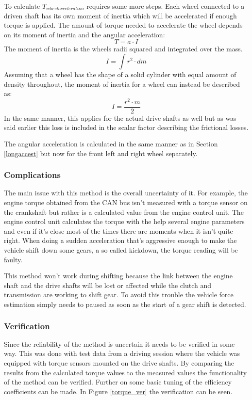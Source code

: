 To calculate $ T_{wheelacceleration} $ requires some more steps. Each wheel connected to a driven shaft has its own moment of inertia which will be accelerated if enough torque is applied. The amount of torque needed to accelerate the wheel depends on its moment of inertia and the angular acceleration:
\begin{equation}
	T = a \cdot I
\end{equation}
The moment of inertia is the wheels radii squared and integrated over the mass. 
\begin{equation}
	I = \int r^2 \cdot dm
\end{equation}
Assuming that a wheel has the shape of a solid cylinder with equal amount of density throughout, the moment of inertia for a wheel can instead be described as:
\begin{equation}
	I = \dfrac{r^2 \cdot m}{2} 
\end{equation}
In the same manner, this applies for the actual drive shafts as well but as was said earlier this loss is included in the scalar factor describing the frictional losses.

The angular acceleration is calculated in the same manner as in Section \ref{longaccest} but now for the front left and right wheel separately.


\subsubsection{Complications}
The main issue with this method is the overall uncertainty of it. For example, the engine torque obtained from the CAN bus isn't measured with a torque sensor on the crankshaft but rather is a calculated value from the engine control unit. The engine control unit calculates the torque with the help several engine parameters and even if it's close most of the times there are moments when it isn't quite right. When doing a sudden acceleration that's aggressive enough to make the vehicle shift down some gears, a so called kickdown, the torque reading will be faulty. 

This method won't work during shifting because the link between the engine shaft and the drive shafts will be lost or affected while the clutch and transmission are working to shift gear. To avoid this trouble the vehicle force estimation simply needs to paused as soon as the start of a gear shift is detected.

\subsubsection{Verification}
Since the reliability of the method is uncertain it needs to be verified in some way. This was done with test data from a driving session where the vehicle was equipped with torque sensors mounted on the drive shafts. By comparing the results from the calculated torque values to the measured values the functionality of the method can be verified. Further on some basic tuning of the efficiency coefficients can be made. In Figure \ref{torque_ver} the verification can be seen.

